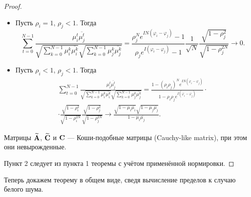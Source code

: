 \documentclass[12pt,a4paper]{article}
\begin{document}
\begin{proof}
\begin{itemize}
			\item Пусть $\rho_i = 1$, $\rho_j < 1$. Тогда
			\begin{equation*}
			\sum_{t=0}^{N-1} \frac{\mu_i^t \overline{\mu_j^t}}{\sqrt{\sum_{k=0}^{N-1} \mu_i^k \overline{\mu_i^k}} \sqrt{\sum_{k=0}^{N-1} \mu_j^k \overline{\mu_j^k}}} = \frac{\rho_j^N e^{I N (\varphi_i -\varphi_j)} - 1}{\rho_j e^{I (\varphi_i - \varphi_j)} - 1}  \frac{1}{\sqrt{N}} \frac{\sqrt{1 - \rho_j^2}}{\sqrt{1 - \rho_j^{2N}}} \to 0.
			\end{equation*}
			
			\item Пусть $\rho_i < 1$, $\rho_j < 1$. Тогда
			\begin{multline*}
			\sum_{t=0}^{N-1} \frac{\mu_i^t \overline{\mu_j^t}}{\sqrt{\sum_{k=0}^{N-1} \mu_i^k \overline{\mu_i^k}} \sqrt{\sum_{k=0}^{N-1} \mu_j^k \overline{\mu_j^k}}} = \frac{1 - (\rho_i \rho_j)^N e^{I N (\varphi_i -\varphi_j)}}{1 - \rho_i \rho_j e^{I (\varphi_i - \varphi_j)}} \cdot \\ \cdot \frac{\sqrt{1 - \rho_i^2}}{\sqrt{1 - \rho_i^{2N}}} \frac{\sqrt{1 - \rho_j^2}}{\sqrt{1 - \rho_j^{2N}}} \to \frac{\sqrt{1 - \mu_{i} \overline{\mu_{i}}}\sqrt{1 - \mu_{j} \overline{\mu_{j}}}}{1 - \mu_{i} \overline{\mu_{j}}}.
			\end{multline*}
				
		\end{itemize}
		
		Матрицы $\widetilde {\mathbf{A}}$, $\widetilde {\mathbf{C}}$ и $\mathbf{C}$ --- Коши-подобные матрицы (Cauchy-like matrix), при этом они невырожденные.
		
		Пункт 2 следует из пункта 1 теоремы с учётом применённой нормировки.
	\end{proof}

Теперь докажем теорему в общем виде, сведя вычисление пределов к случаю белого шума.
\end{document}
